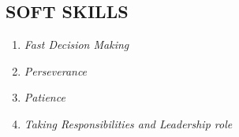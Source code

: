 \documentclass[margin]{res}
\begin{document}
\begin{enumerate}
\section{SOFT SKILLS }\begin{enumerate}
\item{\sl Fast Decision Making }
\item{\sl Perseverance}
\item{\sl Patience}
\item{\sl Taking Responsibilities and Leadership role}
\end{enumerate}





	\end{enumerate}
\end{document}
